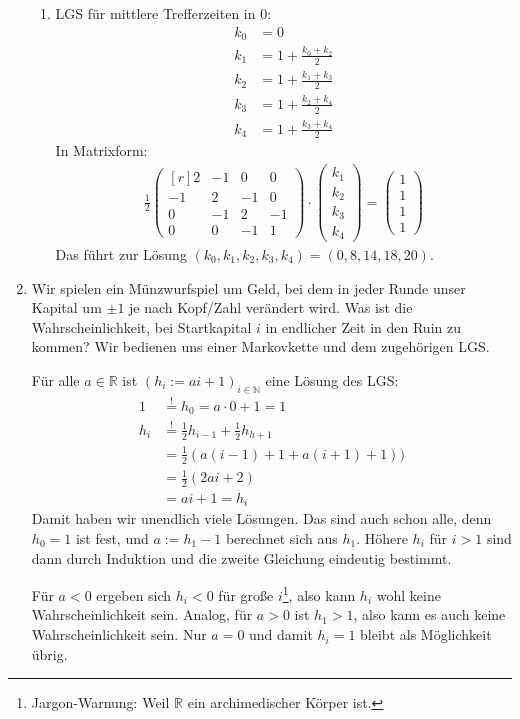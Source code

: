 \documentclass[a4paper,11pt,notitlepage,fullpage]{article}
\newcommand{\R}{\mathbb R}
\newcommand{\N}{\mathbb N}
\begin{document}
\begin{enumerate}
\begin{enumerate}
\item LGS für mittlere Trefferzeiten in $0$:
\begin{align*}
k_0 &= 0 \\
k_1 &= 1 + \frac{k_0 + k_2}{2} \\
k_2 &= 1 + \frac{k_1 + k_3}{2} \\
k_3 &= 1 + \frac{k_2 + k_4}{2} \\
k_4 &= 1 + \frac{k_3 + k_4}{2}
\end{align*}
In Matrixform:
\begin{align*}
\frac{1}{2}
\begin{pmatrix*}[r]
2&-1&0&0 \\
-1&2&-1&0 \\
0&-1&2&-1 \\
0&0&-1&1
\end{pmatrix*} \cdot
\begin{pmatrix}
k_1 \\ k_2 \\ k_3 \\ k_4
\end{pmatrix}
 = 
\begin{pmatrix}
1 \\ 1 \\ 1 \\ 1
\end{pmatrix}
\end{align*}
Das führt zur Lösung $(k_0, k_1, k_2, k_3, k_4) = (0,8,14,18,20)$.
\end{enumerate}

\item Wir spielen ein Münzwurfspiel um Geld, bei dem in jeder Runde unser Kapital um $\pm 1$ je nach Kopf/Zahl verändert wird. Was ist die Wahrscheinlichkeit, bei Startkapital $i$ in endlicher Zeit in den Ruin zu kommen? Wir bedienen uns einer Markovkette und dem zugehörigen LGS.

Für alle $a \in \R$ ist $(h_i := ai + 1)_{i \in \N}$ eine Lösung des LGS:
\begin{align*}
1 &\stackrel{!}{=} h_0 = a\cdot 0 + 1 = 1 \\
h_i &\stackrel{!}{=} \frac{1}{2}h_{i-1} + \frac{1}{2}h_{h+1} \\
&= \frac{1}{2}(a(i-1) + 1 + a(i+1) + 1)) \\
&= \frac{1}{2}(2ai + 2) \\
&= ai+1 = h_i
\end{align*}
Damit haben wir unendlich viele Lösungen. Das sind auch schon alle, denn $h_0 = 1$ ist fest, und $a := h_1 - 1$ berechnet sich aus $h_1$. Höhere $h_i$ für $i>1$ sind dann durch Induktion und die zweite Gleichung eindeutig bestimmt.

Für $a < 0$ ergeben sich $h_i < 0$ für große $i$\footnote{Jargon-Warnung: Weil $\R$ ein archimedischer Körper ist.}, also kann $h_i$ wohl keine Wahrscheinlichkeit sein. Analog, für $a > 0$ ist $h_1 > 1$, also kann es auch keine Wahrscheinlichkeit sein. Nur $a = 0$ und damit $h_i = 1$ bleibt als Möglichkeit übrig.

\end{enumerate}
\end{document}
